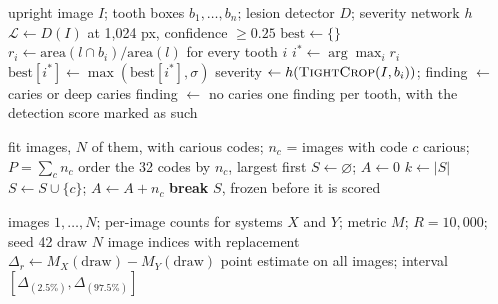 \begin{algorithm}[!htbp]
\caption{Lesion-to-tooth assignment (\texttt{run\_caries\_lesion\_detector})}
\label{alg:lesion}
\begin{algorithmic}[1]
\Require upright image $I$; tooth boxes $b_1,\dots,b_n$; lesion detector $D$; severity network $h$
\State $\mathcal{L} \gets D(I)$ at 1,024 px, confidence $\geq 0.25$ 
\State $\text{best} \gets \{\}$
  \State $r_i \gets \text{area}(l \cap b_i) / \text{area}(l)$ for every tooth $i$ 
    \State $i^{*} \gets \arg\max_i r_i$
    \State $\text{best}[i^{*}] \gets \max(\text{best}[i^{*}], \sigma)$ 
  \EndIf {}
\EndFor
{}
    \State severity $\gets h(\textsc{TightCrop}(I, b_i))$; finding $\gets$ caries or deep caries
  \Else
    \State finding $\gets$ no caries
  \EndIf
\EndFor
\State \Return one finding per tooth, with the detection score marked as such
\end{algorithmic}
\end{algorithm}

\begin{algorithm}[!htbp]
\caption{Fitting the image-blind constant (rule~\eqref{eq:rule})}
\label{alg:constant}
\begin{algorithmic}[1]
\Require fit images, $N$ of them, with carious codes; $n_c$ = images with code $c$ carious; $P = \sum_c n_c$
\State order the 32 codes by $n_c$, largest first
\State $S \gets \varnothing$; $A \gets 0$
  \State $k \gets |S|$
   
    \State $S \gets S \cup \{c\}$; $A \gets A + n_c$
  \Else
    \State \textbf{break} 
  \EndIf
\EndFor
\State \Return $S$, frozen before it is scored
\end{algorithmic}
\end{algorithm}

\begin{algorithm}[!htbp]
\caption{Paired cluster bootstrap}
\label{alg:bootstrap}
\begin{algorithmic}[1]
\Require images $1,\dots,N$; per-image counts for systems $X$ and $Y$; metric $M$; $R = 10{,}000$; seed 42
  \State draw $N$ image indices with replacement 
  \State $\Delta_r \gets M_X(\text{draw}) - M_Y(\text{draw})$ 
\EndFor
\State \Return point estimate on all images; interval $[\Delta_{(2.5\%)}, \Delta_{(97.5\%)}]$
\end{algorithmic}
\end{algorithm}

